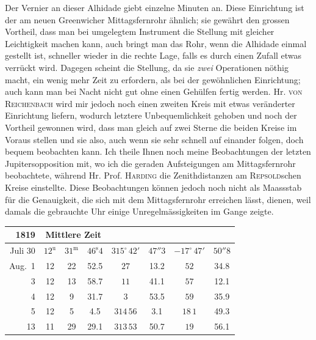 Der Vernier an dieser Alhidade giebt einzelne Minuten an. Diese Einrichtung ist der am neuen Greenwicher Mittagsfernrohr ähnlich; sie gewährt den grossen Vortheil, dass man bei umgelegtem Instrument die Stellung mit gleicher Leichtigkeit machen kann, auch bringt man das Rohr, wenn die Alhidade einmal gestellt ist, schneller wieder in die rechte Lage, falls es durch einen Zufall etwas verrückt
wird. Dagegen scheint die Stellung, da sie \emph{zwei} Operationen nöthig macht, ein wenig mehr Zeit zu
erfordern, als bei der gewöhnlichen Einrichtung; auch kann man bei Nacht nicht gut ohne einen Gehülfen fertig werden. Hr. \textsc{von Reichenbach} wird mir jedoch noch einen zweiten Kreis mit etwas veränderter Einrichtung liefern, wodurch letztere Unbequemlichkeit gehoben und noch der Vortheil gewonnen wird, dass man gleich auf zwei Sterne die beiden Kreise im Voraus stellen und sie also, auch wenn
sie sehr schnell auf einander folgen, doch bequem beobachten kann. Ich theile Ihnen noch meine Beobachtungen der letzten Jupitersopposition mit, wo ich die geraden Aufsteigungen am Mittagsfernrohr
beobachtete, während Hr. Prof. \textsc{Harding} die Zenithdistanzen am \textsc{Repsold}schen Kreise einstellte. Diese
Beobachtungen können jedoch noch nicht als Maassstab für die Genauigkeit, die sich mit dem Mittagsfernrohr erreichen lässt, dienen, weil damals die gebrauchte Uhr einige Unregelmässigkeiten im Gange
zeigte.

\begin{center}
\begin{tabular}{r|ccc|cc|cc}
1819 & \multicolumn{3}{c|}{Mittlere Zeit} & \multicolumn{2}{c|}{} & \multicolumn{2}{c}{} \\
\hline
Juli 30 & $12^{\mathrm{u}}$ & $31^{\mathrm{m}}$ & $46^{\mathrm{s}}4$ & $315^{\circ}\,42'$ & $47''3$ & $-17^{\circ}\,47'$ & $50''8$ \\
Aug.\ 1 & 12 & 22 & 52.5 & $27$ & 13.2 & $52$ & 34.8 \\
3 & 12 & 13 & 58.7 & $11$ & 41.1 & $57$ & 12.1 \\
4 & 12 & 9 & 31.7 & $3$ & 53.5 & $59$ & 35.9 \\
5 & 12 & 5 & 4.5 & $314\,56$ & 3.1 & $18\,1$ & 49.3 \\
13 & 11 & 29 & 29.1 & $313\,53$ & 50.7 & $19$ & 56.1 \\
\end{tabular}
\end{center}

